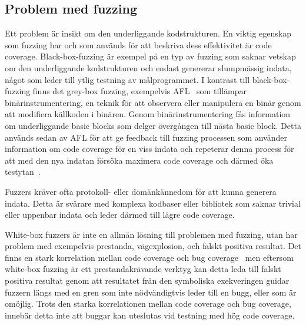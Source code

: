 \subsection{Problem med fuzzing} Ett problem är insikt om den underliggande
kodstrukturen. En viktig egenskap som fuzzing har och som används för att beskriva dess
effektivitet är code coverage. Black-box-fuzzing är exempel på en typ av fuzzing som
saknar vetskap om den underliggande kodstrukturen och endast genererar
slumpmässig indata, något som leder till ytlig testning av målprogrammet. I
kontrast till black-box-fuzzing finns det grey-box fuzzing, exempelvis
AFL~\cite{aflplusplus} som tillämpar binärinstrumentering, en
teknik för att observera eller manipulera en binär genom att modifiera källkoden
i binären. Genom binärinstrumentering fås information om underliggande basic blocks
som delger övergången till nästa basic block. Detta används sedan av AFL för att ge
feedback till fuzzing processen som använder information om code coverage
för en viss indata och repeterar denna process för att med den nya indatan försöka
maximera code coverage och därmed öka testytan~\cite{challenges_fuzzing}.

Fuzzers kräver ofta protokoll- eller domänkännedom för att kunna generera
indata. Detta är svårare med komplexa kodbaser eller bibliotek som saknar
trivial eller uppenbar indata och leder därmed till lägre code coverage.

White-box fuzzers är inte en allmän lösning till problemen med fuzzing, utan
har problem med exempelvis prestanda, vägexplosion, och falskt positiva
resultat. Det finns en stark korrelation mellan code coverage och bug
coverage~\cite{directed_greybox_fuzzing} men eftersom white-box fuzzing är ett
prestandakrävande verktyg kan detta leda till falskt positiva resultat genom att
resultatet från den symboliska exekveringen guidar fuzzern längs med en gren som
inte nödvändigtvis leder till en bugg, eller som är omöjlig. Trots den starka korrelationen
mellan code coverage och bug coverage, innebär detta inte att buggar kan uteslutas vid
testning med hög code coverage.

